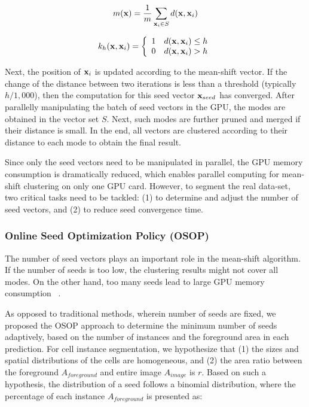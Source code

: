 \documentclass[journal,twoside,web]{ieeecolor}
\begin{document}
\begin{equation}
m({\bf{x}}) = \frac{1}{m}\sum\limits_{{{\bf{x}}_i} \in S} {d({\bf{x}},{{\bf{x}}_i})} 
\label{eq10}\end{equation}

\begin{equation}
{k_h}({\bf{x}},{{\bf{x}}_i}) = \left\{ {\begin{array}{*{20}{c}}
1&{d({\bf{x}},{{\bf{x}}_i}) \le h}\\
0&{d({\bf{x}},{{\bf{x}}_i}) > h}
\end{array}} \right.
\label{eq11}\end{equation}

Next, the position of ${{\bf{x}}_i}$ is updated according to the mean-shift vector. If the change of the distance between two iterations is less than a threshold (typically $h/1,000$), then the computation for this seed vector ${{\bf{x}}_{seed}}$ has converged. After parallelly manipulating the batch of seed vectors in the GPU, the modes are obtained in the vector set $S$. Next, such modes are further pruned and merged if their distance is small. In the end, all vectors are clustered according to their distance to each mode to obtain the final result.

Since only the seed vectors need to be manipulated in parallel, the GPU memory consumption is dramatically reduced, which enables parallel computing for mean-shift clustering on only one GPU card. However, to segment the real data-set, two critical tasks need to be tackled: (1) to determine and adjust the number of seed vectors, and (2) to reduce seed convergence time.

\subsubsection{Online Seed Optimization Policy (OSOP)}
The number of seed vectors plays an important role in the mean-shift algorithm. If the number of seeds is too low, the clustering results might not cover all modes. On the other hand, too many seeds lead to large GPU memory consumption ~\cite{b18}.

As opposed to traditional methods, wherein number of seeds are fixed, we proposed the OSOP approach to determine the minimum number of seeds adaptively, based on the number of instances and the foreground area in each prediction. For cell instance segmentation, we hypothesize that (1) the sizes and spatial distributions of the cells are homogeneous, and (2) the area ratio between the foreground ${A_{foreground}}$ and entire image ${A_{image}}$ is $r$. Based on such a hypothesis, the distribution of a seed follows a binomial distribution, where the percentage of each instance ${A_{foreground}}$  is presented as:
\end{document}

